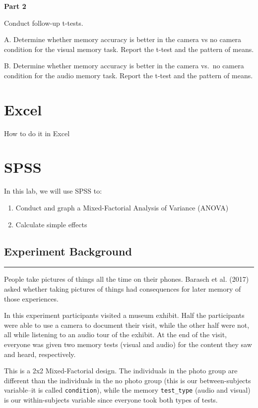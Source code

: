 \documentclass[]{book}
\providecommand{\tightlist}{%
  \setlength{\itemsep}{0pt}\setlength{\parskip}{0pt}}
\begin{document}
\textbf{Part 2}

Conduct follow-up t-tests.

A. Determine whether memory accuracy is better in the camera vs no
camera condition for the visual memory task. Report the t-test and the
pattern of means.

B. Determine whether memory accuracy is better in the camera vs.~no
camera condition for the audio memory task. Report the t-test and the
pattern of means.

\section{Excel}\label{excel-11}

How to do it in Excel

\section{SPSS}\label{spss-11}

In this lab, we will use SPSS to:

\begin{enumerate}
\def\labelenumi{\arabic{enumi}.}
\tightlist
\item
  Conduct and graph a Mixed-Factorial Analysis of Variance (ANOVA)
\item
  Calculate simple effects
\end{enumerate}

\subsection{Experiment Background}\label{experiment-background-6}

\begin{center}\rule{0.5\linewidth}{0.5pt}\end{center}

People take pictures of things all the time on their phones. Barasch et
al. (2017) asked whether taking pictures of things had consequences for
later memory of those experiences.

In this experiment participants visited a museum exhibit. Half the
participants were able to use a camera to document their visit, while
the other half were not, all while listening to an audio tour of the
exhibit. At the end of the visit, everyone was given two memory tests
(visual and audio) for the content they saw and heard, respectively.

This is a 2x2 Mixed-Factorial design. The individuals in the photo group
are different than the individuals in the no photo group (this is our
between-subjects variable--it is called \texttt{condition}), while the
memory \texttt{test\_type} (audio and visual) is our within-subjects
variable since everyone took both types of tests.
\end{document}
